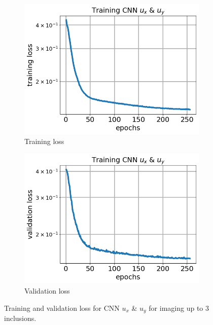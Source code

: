 \documentclass[12pt]{article}
\newcommand{\nhgfigheight}{4.0cm}
\begin{document}
\begin{figure}[h]
  \centering
  \begin{subfigure}[b]{0.45\linewidth}
    \includegraphics[totalheight=\nhgfigheight]{Figures/final3/training/uxuy/field_images_plot_loss.png}
    \caption{Training loss}
  \end{subfigure}
  \begin{subfigure}[b]{0.45\linewidth}
    \includegraphics[totalheight=\nhgfigheight]{Figures/final3/training/uxuy/field_images_plot_val_loss.png}
    \caption{Validation loss}
  \end{subfigure}
  \caption{\label{fig:oneinc:trainuxuy3} Training and validation loss for CNN $u_x$ \& $u_y$ for imaging up to 3 inclusions.}
\end{figure}
\end{document}
